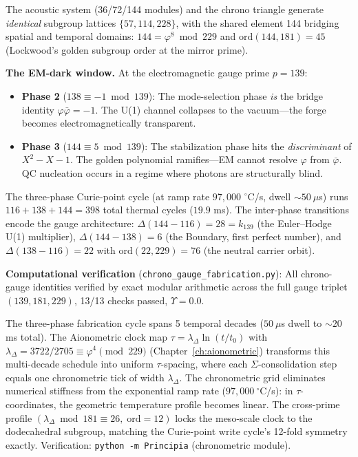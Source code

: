 \noindent The acoustic system (36/72/144 modules) and the chrono triangle generate \emph{identical} subgroup lattices $\{57, 114, 228\}$, with the shared element 144 bridging spatial and temporal domains: $144 = \varphi^8 \bmod 229$ and $\mathrm{ord}(144, 181) = 45$ (Lockwood's golden subgroup order at the mirror prime).

\textbf{The EM-dark window.} At the electromagnetic gauge prime $p = 139$:
\begin{itemize}
\item \textbf{Phase 2} ($138 \equiv -1 \bmod 139$): The mode-selection phase \emph{is} the bridge identity $\varphi \bar{\varphi} = -1$. The U(1) channel collapses to the vacuum---the forge becomes electromagnetically transparent.
\item \textbf{Phase 3} ($144 \equiv 5 \bmod 139$): The stabilization phase hits the \emph{discriminant} of $X^2 - X - 1$. The golden polynomial ramifies---EM cannot resolve $\varphi$ from $\bar{\varphi}$. QC nucleation occurs in a regime where photons are structurally blind.
\end{itemize}

\noindent The three-phase Curie-point cycle (at ramp rate $97{,}000$ $^\circ$C/s, dwell $\sim 50~\mu$s) runs $116 + 138 + 144 = 398$ total thermal cycles ($19.9$ ms). The inter-phase transitions encode the gauge architecture: $\Delta(144 - 116) = 28 = k_{139}$ (the Euler--Hodge U(1) multiplier), $\Delta(144 - 138) = 6$ (the Boundary, first perfect number), and $\Delta(138 - 116) = 22$ with $\mathrm{ord}(22, 229) = 76$ (the neutral carrier orbit).

\textbf{Computational verification} (\texttt{chrono\_gauge\_fabrication.py}): All chrono-gauge identities verified by exact modular arithmetic across the full gauge triplet $(139, 181, 229)$, 13/13 checks passed, $\Upsilon = 0.0$.

\begin{remark}
The three-phase fabrication cycle spans 5 temporal decades ($50~\mu$s dwell to ${\sim}20$ ms total).  The Aionometric clock map $\tau = \lambda_\Delta \ln(t/t_0)$ with $\lambda_\Delta = 3722/2705 \equiv \varphi^4 \pmod{229}$ (Chapter~\ref{ch:aionometric}) transforms this multi-decade schedule into uniform $\tau$-spacing, where each $\Sigma$-consolidation step equals one chronometric tick of width $\lambda_\Delta$.  The chronometric grid eliminates numerical stiffness from the exponential ramp rate ($97{,}000~{}^\circ$C/s): in $\tau$-coordinates, the geometric temperature profile becomes linear.  The cross-prime profile $(\lambda_\Delta \bmod 181 \equiv 26,\;\mathrm{ord} = 12)$ locks the meso-scale clock to the dodecahedral subgroup, matching the Curie-point write cycle's 12-fold symmetry exactly.  Verification: \texttt{python -m Principia} (chronometric module).
\end{remark}


